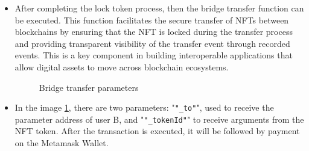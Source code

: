 \begin{itemize}
    \item After completing the lock token process, then the bridge transfer function can be executed. This function facilitates the secure transfer of NFTs between blockchains by ensuring that the NFT is locked during the transfer process and providing transparent visibility of the transfer event through recorded events. This is a key component in building interoperable applications that allow digital assets to move across blockchain ecosystems.

    \begin{figure} [H] \centering
    \caption{Bridge transfer parameters}
    \label{fig:bridge_transfer}
    \end{figure}

    \item In the image \ref{fig:bridge_transfer}, there are two parameters: "\texttt{"\_to"}", used to receive the parameter address of user B, and "\texttt{"\_tokenId"}" to receive arguments from the NFT token. After the transaction is executed, it will be followed by payment on the Metamask Wallet.


\end{itemize}
